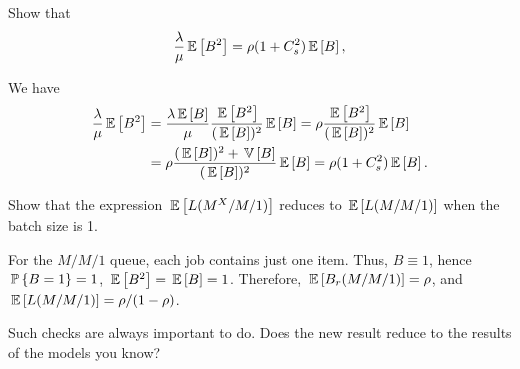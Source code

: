 \begin{question}\label{q:batch}
Show that 
\begin{equation*}
  \frac{\lambda}\mu \E{B^2} = \rho (1+C_s^2)\E B, 
\end{equation*}
  \begin{solution}
We have
\begin{equation*}
  \begin{split}
  \frac{\lambda}\mu \E{B^2} 
&=   \frac{\lambda\E B}{\mu} \frac{\E{B^2}}{(\E B)^2} \E B  = \rho \frac{\E{B^2}}{(\E B)^2} \E B \\
&= \rho \frac{(\E B)^2+\V B}{(\E B)^2}\E B = \rho (1+C_s^2)\E B.
  \end{split}
\end{equation*}
  \end{solution}
\end{question}

\begin{question}
  Show that the expression $\E{L(M^X/M/1)}$ reduces to
  $\E{L(M/M/1)}$ when the batch size is 1.  
  \begin{solution}
    For the $M/M/1$ queue, each job contains just one item. Thus,
    $B\equiv 1$, hence $\P{B=1}=1$, $\E{B^2}=\E B =1$. Therefore,
    $\E{B_r(M/M/1)}= \rho$, and $\E{L(M/M/1)}=\rho/(1-\rho)$. 

      Such checks are always important to do. Does the new result
      reduce to the results of the models you know?
  \end{solution}

\end{question}

